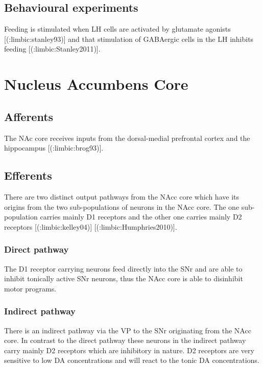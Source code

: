 {{\subsection{Behavioural experiments}

Feeding is stimulated when LH cells are activated by glutamate
agonists [(:limbic:stanley93)] and that stimulation of GABAergic cells in the LH inhibits feeding [(:limbic:Stanley2011)].





\section{Nucleus Accumbens Core}

\subsection{Afferents}

The NAc core receives inputs from the dorsal-medial prefrontal cortex and the hippocampus [(:limbic:brog93)].

\subsection{Efferents}

There are two distinct output pathways from the NAcc core which have its origins from the two sub-populations of neurons in the NAcc core. The one sub-population carries mainly D1 receptors and the other one carries mainly D2 receptors [(:limbic:kelley04)] [(:limbic:Humphries2010)]. 

\subsubsection{Direct pathway}

The D1 receptor carrying neurons feed directly into the SNr and are able to inhibit tonically active SNr neurons, thus the NAcc core is able to disinhibit motor programs. 

\subsubsection{Indirect pathway}

There is an indirect pathway via the VP to the SNr originating from the NAcc core. In contrast to the direct pathway these neurons in the indirect pathway carry mainly D2 receptors which are inhibitory in nature. D2 receptors are very sensitive to low DA concentrations and will react to the tonic DA concentrations. 




}}

